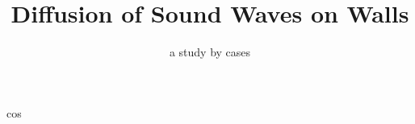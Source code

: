 \documentclass[compress]{beamer}
\title[]{Diffusion of Sound Waves on Walls}
\subtitle{a study by cases}
\author[]{}
\institute[]{}
\date{}
\begin{document}
\newcommand{\topo}{cos}
\newcommand{\freq}{1000}

\begin{frame}[plain]
  \titlepage
\end{frame}

\begin{frame}
  \frametitle{}
  \framesubtitle{}
\topo
\end{frame}
\end{document}

